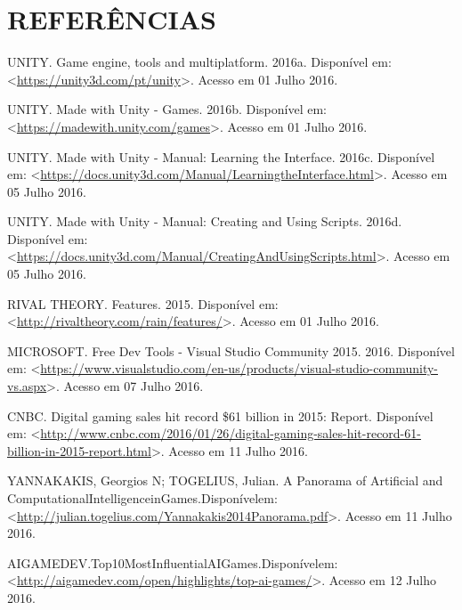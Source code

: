 \documentclass[12pt,a4paper]{article}
\begin{document}
\section*{\hfil REFERÊNCIAS}
	\singlespace
	UNITY. Game engine, tools and multiplatform. 2016a. Disponível em: \textless \url{https://unity3d.com/pt/unity}\textgreater. Acesso em 01 Julho 2016.\par
	UNITY. Made with Unity - Games. 2016b. Disponível em: \textless \url{https://madewith.unity.com/games}\textgreater. Acesso em 01 Julho 2016.\par
	UNITY. Made with Unity - Manual: Learning the Interface. 2016c. Disponível em: \textless \url{https://docs.unity3d.com/Manual/LearningtheInterface.html}\textgreater. Acesso em 05 Julho 2016.\par
	UNITY. Made with Unity - Manual: Creating and Using Scripts. 2016d. Disponível em: \textless \url{https://docs.unity3d.com/Manual/CreatingAndUsingScripts.html}\textgreater. Acesso em 05 Julho 2016.\par
	RIVAL THEORY. Features. 2015. Disponível em: \textless \url{http://rivaltheory.com/rain/features/}\textgreater. Acesso em 01 Julho 2016.\par
	MICROSOFT. Free Dev Tools - Visual Studio Community 2015. 2016. Disponível em: \textless \url{https://www.visualstudio.com/en-us/products/visual-studio-community-vs.aspx}\textgreater. Acesso em 07 Julho 2016.\par
	CNBC. Digital gaming sales hit record \$61 billion in 2015: Report. Disponível em: \textless\hspace{1pt}\url{http://www.cnbc.com/2016/01/26/digital-gaming-sales-hit-record-61-billion-in-2015-report.html}\textgreater. Acesso em 11 Julho 2016.\par
	YANNAKAKIS, Georgios N; TOGELIUS, Julian. A Panorama of Artificial and Computational\hspace{8pt}Intelligence\hspace{8pt}in\hspace{8pt}Games.\hspace{8pt}Disponível\hspace{8pt}em:\hspace{8pt}\textless\hspace{3,35pt}\url{http://julian.togelius.com/Yannakakis2014Panorama.pdf}\textgreater. Acesso em 11 Julho 2016.\par
	AIGAMEDEV.\hspace{8pt}Top\hspace{8pt}10\hspace{8pt}Most\hspace{8pt}Influential\hspace{8pt}AI\hspace{8pt}Games.\hspace{8pt}Disponível\hspace{8pt}em:\hspace{8pt}\textless\hspace{3,3pt}\url{http://aigamedev.com/open/highlights/top-ai-games/}\textgreater. Acesso em 12 Julho 2016.\par
\end{document}
